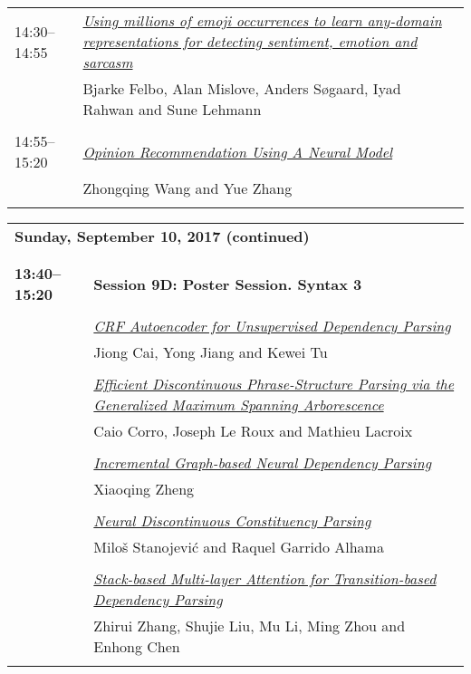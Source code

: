 \begin{tabular}{p{20mm}p{128mm}}
14:30--14:55 & \hyperlink{page.1614}{\em Using millions of emoji occurrences to learn any-domain representations for detecting sentiment, emotion and sarcasm}\\
         & Bjarke Felbo, Alan Mislove, Anders S{\o}gaard, Iyad Rahwan and Sune Lehmann \\
\\

14:55--15:20 & \hyperlink{page.1625}{\em Opinion Recommendation Using A Neural Model}\\
         & Zhongqing Wang and Yue Zhang \\
\\

\end{tabular}
\newpage
\begin{tabular}{p{20mm}p{128mm}}
\\
\multicolumn{2}{l}{\bf Sunday, September 10, 2017 (continued)} \\\\
\\{\bf 13:40--15:20} & {\bf Session 9D: Poster Session. Syntax 3 } \\
\\
 & \hyperlink{page.1637}{\em CRF Autoencoder for Unsupervised Dependency Parsing}\\
         & Jiong Cai, Yong Jiang and Kewei Tu \\
\\

 & \hyperlink{page.1643}{\em Efficient Discontinuous Phrase-Structure Parsing via the Generalized Maximum Spanning Arborescence}\\
         & Caio Corro, Joseph Le Roux and Mathieu Lacroix \\
\\

 & \hyperlink{page.1654}{\em Incremental Graph-based Neural Dependency Parsing}\\
         & Xiaoqing Zheng \\
\\

 & \hyperlink{page.1665}{\em Neural Discontinuous Constituency Parsing}\\
         & Milo\v{s} Stanojevi\'{c} and Raquel Garrido Alhama \\
\\

 & \hyperlink{page.1676}{\em Stack-based Multi-layer Attention for Transition-based Dependency Parsing}\\
         & Zhirui Zhang, Shujie Liu, Mu Li, Ming Zhou and Enhong Chen \\
\\


\end{tabular}
